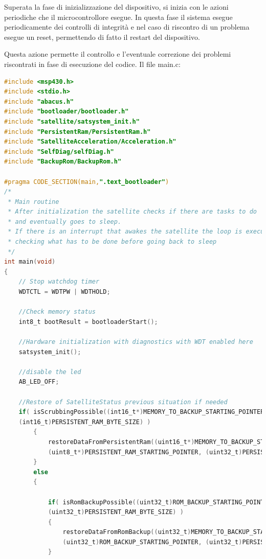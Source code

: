 \documentclass[LaM,binding=0.6cm]{../sapthesis}
\begin{document}
Superata la fase di inizializzazione del dispositivo, si inizia con le azioni periodiche che il microcontrollore esegue. In questa fase il sistema esegue periodicamente dei controlli di integrità e nel caso di riscontro di un problema esegue un reset, permettendo di fatto il restart del dispositivo. 

Questa azione permette il controllo e l'eventuale correzione dei problemi riscontrati in fase di esecuzione del codice.
\newline\newline
Il file main.c:

\begin{small}
\begin{lstlisting}[language=C]
#include <msp430.h>
#include <stdio.h>
#include "abacus.h"
#include "bootloader/bootloader.h"
#include "satellite/satsystem_init.h"
#include "PersistentRam/PersistentRam.h"
#include "SatelliteAcceleration/Acceleration.h"
#include "SelfDiag/selfDiag.h"
#include "BackupRom/BackupRom.h"

#pragma CODE_SECTION(main,".text_bootloader")
/*
 * Main routine
 * After initialization the satellite checks if there are tasks to do 
 * and eventually goes to sleep.
 * If there is an interrupt that awakes the satellite the loop is executed
 * checking what has to be done before going back to sleep
 */
int main(void)
{
    // Stop watchdog timer
    WDTCTL = WDTPW | WDTHOLD;

    //Check memory status
    int8_t bootResult = bootloaderStart();
    
    //Hardware initialization with diagnostics with WDT enabled here
    satsystem_init();

    //disable the led
    AB_LED_OFF;
    
    //Restore of SatelliteStatus previous situation if needed
    if( isScrubbingPossible((int16_t*)MEMORY_TO_BACKUP_STARTING_POINTER,
    (int16_t)PERSISTENT_RAM_BYTE_SIZE) )
        {
            restoreDataFromPersistentRam((uint16_t*)MEMORY_TO_BACKUP_STARTING_POINTER,
            (uint8_t*)PERSISTENT_RAM_STARTING_POINTER, (uint32_t)PERSISTENT_RAM_BYTE_SIZE);
        }
        else
        {

            if( isRomBackupPossible((uint32_t)ROM_BACKUP_STARTING_POINTER,
            (uint32_t)PERSISTENT_RAM_BYTE_SIZE) )
            {
                restoreDataFromRomBackup((uint32_t)MEMORY_TO_BACKUP_STARTING_POINTER, 
                (uint32_t)ROM_BACKUP_STARTING_POINTER, (uint32_t)PERSISTENT_RAM_BYTE_SIZE);
            }


\end{lstlisting}
\end{small}
\end{document}
